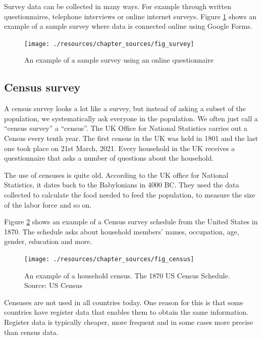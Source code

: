 \documentclass[
]{book}
\begin{document}
Survey data can be collected in many ways. For example through written questionnaires, telephone interviews or online internet surveys. Figure \ref{fig:source1} shows an example of a sample survey where data is connected online using Google Forms.

\begin{figure}

{\centering \texttt{[image: ./resources/chapter\_sources/fig\_survey]} 

}

\caption{An example of a sample survey using an online questionnaire}\label{fig:source1}
\end{figure}

\hypertarget{census-survey}{%
\subsection*{Census survey}\label{census-survey}}

A census survey looks a lot like a survey, but instead of asking a subset of the population, we systematically ask everyone in the population. We often just call a ``census survey'' a ``census''. The UK Office for National Statistics carries out a Census every tenth year. The first census in the UK was held in 1801 and the last one took place on 21st March, 2021. Every household in the UK receives a questionnaire that asks a number of questions about the household.

The use of censuses is quite old. According to the UK office for National Statistics, it dates back to the Babylonians in 4000 BC. They used the data collected to calculate the food needed to feed the population, to measure the size of the labor force and so on.

Figure \ref{fig:source2} shows an example of a Census survey schedule from the United States in 1870. The schedule asks about household members' names, occupation, age, gender, education and more.

\begin{figure}

{\centering \texttt{[image: ./resources/chapter\_sources/fig\_census]} 

}

\caption{An example of a household census. The 1870 US Census Schedule. Source: US Census}\label{fig:source2}
\end{figure}

Censuses are not used in all countries today. One reason for this is that some countries have register data that enables them to obtain the same information. Register data is typically cheaper, more frequent and in some cases more precise than census data.
\end{document}
